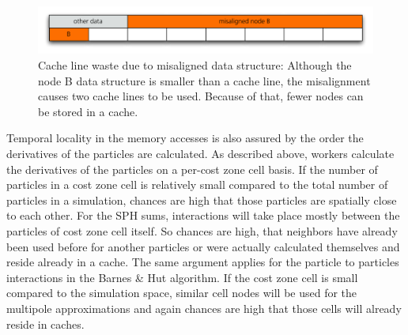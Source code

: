 \begin{figure}[htbp]
\begin{center}
\includegraphics[scale=0.6]{30algo_misalign.pdf}
\caption{Cache line waste due to misaligned data structure: Although the node B data structure is smaller than a cache line, the misalignment causes two cache lines to be used. Because of that, fewer nodes can be stored in a cache.}
\label{ch02_fig30}
\end{center}
\end{figure}

Temporal locality in the memory accesses is also assured by the order the derivatives of the particles are calculated. As described above, workers calculate the derivatives of the particles on a per-cost zone cell basis. If the number of particles in a cost zone cell is relatively small compared to the total number of particles in a simulation, chances are high that those particles are spatially close to each other. For the SPH sums, interactions will take place mostly between the particles of cost zone cell itself. So chances are high, that neighbors have already been used before for another particles or were actually calculated themselves and reside already in a cache. The same argument applies for the particle to particles interactions in the Barnes \& Hut algorithm. If the cost zone cell is small compared to the simulation space, similar cell nodes will be used for the multipole approximations and again chances are high that those cells will already reside in caches.



